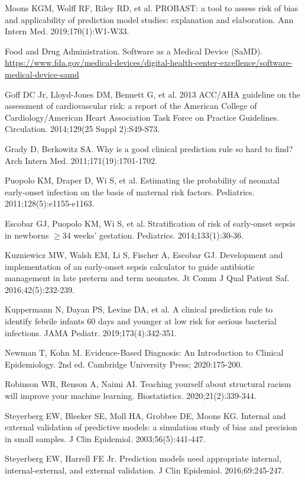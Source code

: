 \begin{references}
\item Moons KGM, Wolff RF, Riley RD, et al. PROBAST: a tool to assess risk of bias and applicability of prediction model studies: explanation and elaboration. Ann Intern Med. 2019;170(1):W1-W33.
\item Food and Drug Administration. Software as a Medical Device (SaMD). \url{https://www.fda.gov/medical-devices/digital-health-center-excellence/software-medical-device-samd}
\item Goff DC Jr, Lloyd-Jones DM, Bennett G, et al. 2013 ACC/AHA guideline on the assessment of cardiovascular risk: a report of the American College of Cardiology/American Heart Association Task Force on Practice Guidelines. Circulation. 2014;129(25 Suppl 2):S49-S73.
\item Grady D, Berkowitz SA. Why is a good clinical prediction rule so hard to find? Arch Intern Med. 2011;171(19):1701-1702.
\item Puopolo KM, Draper D, Wi S, et al. Estimating the probability of neonatal early-onset infection on the basis of maternal risk factors. Pediatrics. 2011;128(5):e1155-e1163.
\item Escobar GJ, Puopolo KM, Wi S, et al. Stratification of risk of early-onset sepsis in newborns \ensuremath{\geq}34 weeks’ gestation. Pediatrics. 2014;133(1):30-36.
\item Kuzniewicz MW, Walsh EM, Li S, Fischer A, Escobar GJ. Development and implementation of an early-onset sepsis calculator to guide antibiotic management in late preterm and term neonates. Jt Comm J Qual Patient Saf. 2016;42(5):232-239.
\item Kuppermann N, Dayan PS, Levine DA, et al. A clinical prediction rule to identify febrile infants 60 days and younger at low risk for serious bacterial infections. JAMA Pediatr. 2019;173(4):342-351.
\item Newman T, Kohn M. Evidence-Based Diagnosis: An Introduction to Clinical Epidemiology. 2nd ed. Cambridge University Press; 2020:175-200.
\item Robinson WR, Renson A, Naimi AI. Teaching yourself about structural racism will improve your machine learning. Biostatistics. 2020;21(2):339-344.
\item Steyerberg EW, Bleeker SE, Moll HA, Grobbee DE, Moons KG. Internal and external validation of predictive models: a simulation study of bias and precision in small samples. J Clin Epidemiol. 2003;56(5):441-447.
\item Steyerberg EW, Harrell FE Jr. Prediction models need appropriate internal, internal-external, and external validation. J Clin Epidemiol. 2016;69:245-247.

\end{references}
